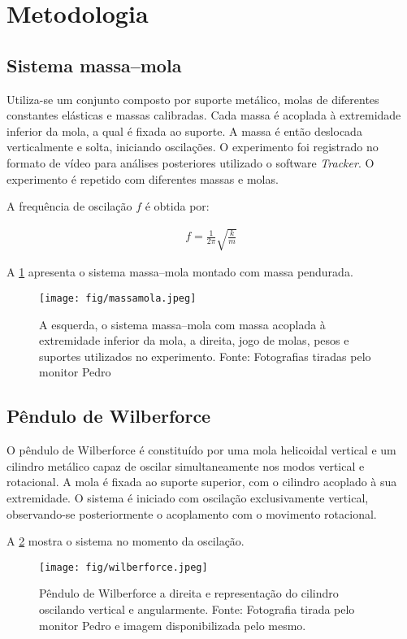 \section{Metodologia}

\subsection{Sistema massa–mola}

Utiliza-se um conjunto composto por suporte metálico, molas de diferentes constantes elásticas e massas calibradas. Cada massa é acoplada à extremidade inferior da mola, a qual é fixada ao suporte. A massa é então deslocada verticalmente e solta, iniciando oscilações. O experimento foi registrado no formato de vídeo para análises posteriores utilizado o software \textit{Tracker}. O experimento é repetido com diferentes massas e molas.

A frequência de oscilação \(f\) é obtida por:

\begin{align*}
    f = \frac{1}{2\pi} \sqrt{\frac{k}{m}}
\end{align*}

A \cref{fig:massamola} apresenta o sistema massa–mola montado com massa pendurada.

\begin{figure}[H]
    \centering
    \texttt{[image: fig/massamola.jpeg]}
    \caption{A esquerda, o sistema massa–mola com massa acoplada à extremidade inferior da mola, a direita, jogo de molas, pesos e suportes utilizados no experimento. Fonte: Fotografias tiradas pelo monitor Pedro}
    \label{fig:massamola}
\end{figure}

\subsection{Pêndulo de Wilberforce}

O pêndulo de Wilberforce é constituído por uma mola helicoidal vertical e um cilindro metálico capaz de oscilar simultaneamente nos modos vertical e rotacional. A mola é fixada ao suporte superior, com o cilindro acoplado à sua extremidade. O sistema é iniciado com oscilação exclusivamente vertical, observando-se posteriormente o acoplamento com o movimento rotacional.

A \cref{fig:wilberforce} mostra o sistema no momento da oscilação.

\begin{figure}[H]
    \centering
    \texttt{[image: fig/wilberforce.jpeg]}
    \caption{Pêndulo de Wilberforce a direita e representação do cilindro oscilando vertical e angularmente. Fonte: Fotografia tirada pelo monitor Pedro e imagem disponibilizada pelo mesmo.}
    \label{fig:wilberforce}
\end{figure}

